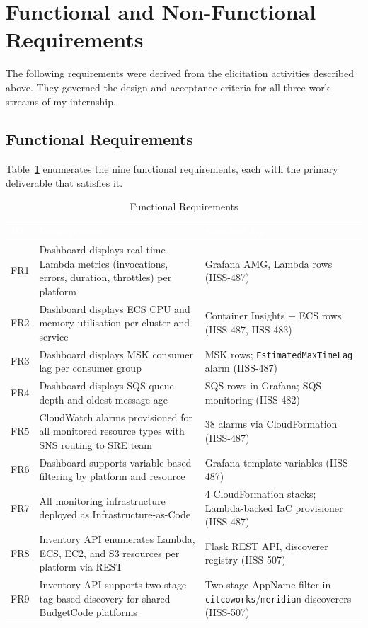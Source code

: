 \section{Functional and Non-Functional Requirements}
\label{sec:requirements}

The following requirements were derived from the elicitation activities
described above. They governed the design and acceptance criteria for
all three work streams of my internship.

\subsection{Functional Requirements}

Table~\ref{tab:functional_requirements} enumerates the nine functional
requirements, each with the primary deliverable that satisfies it.

\begin{table}[ht]
\centering
\caption{Functional Requirements}
\label{tab:functional_requirements}
\begin{tabularx}{\textwidth}{p{0.9cm}Xp{5.0cm}}
\hline
\rowcolor{smubrand}\textcolor{white}{\textbf{ID}} & \textcolor{white}{\textbf{Requirement}} & \textcolor{white}{\textbf{Satisfied By}} \\
\hline
FR1 & Dashboard displays real-time Lambda metrics (invocations, errors, duration, throttles) per platform & Grafana AMG, Lambda rows (IISS-487) \\
FR2 & Dashboard displays ECS CPU and memory utilisation per cluster and service & Container Insights + ECS rows (IISS-487, IISS-483) \\
FR3 & Dashboard displays MSK consumer lag per consumer group & MSK rows; \texttt{EstimatedMaxTimeLag} alarm (IISS-487) \\
FR4 & Dashboard displays SQS queue depth and oldest message age & SQS rows in Grafana; SQS monitoring (IISS-482) \\
FR5 & CloudWatch alarms provisioned for all monitored resource types with SNS routing to SRE team & 38 alarms via CloudFormation (IISS-487) \\
FR6 & Dashboard supports variable-based filtering by platform and resource & Grafana template variables (IISS-487) \\
FR7 & All monitoring infrastructure deployed as Infrastructure-as-Code & 4 CloudFormation stacks; Lambda-backed IaC provisioner (IISS-487) \\
FR8 & Inventory API enumerates Lambda, ECS, EC2, and S3 resources per platform via REST & Flask REST API, discoverer registry (IISS-507) \\
FR9 & Inventory API supports two-stage tag-based discovery for shared BudgetCode platforms & Two-stage AppName filter in \texttt{citcoworks}/\texttt{meridian} discoverers (IISS-507) \\
\hline
\end{tabularx}
\end{table}


